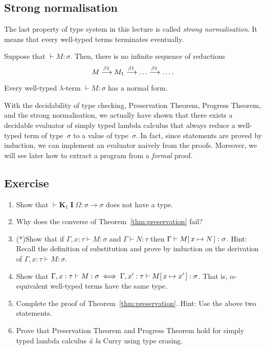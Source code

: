 \subsection{Strong normalisation}
The last property of type system in this lecture is called \emph{strong
  normalisation}. It means that every well-typed terms terminates eventually. 
\begin{theorem}
  Suppose that ${}\vdash M : \sigma$. Then,
  there is no infinite sequence of reductions
  \[
    M \xrightarrow{\beta1} M_1 \xrightarrow{\beta1} \dots \xrightarrow{\beta1} \dots.
  \]
\end{theorem}
\begin{corollary}
  Every well-typed $\lambda$-term ${}\vdash M:\sigma$ has a normal form.
\end{corollary}
With the decidability of type checking, Preservation Theorem, Progress Theorem,
and the strong normalisation, we actually have shown that there exists a
decidable evaluator of simply typed lambda calculus that always reduce a
well-typed term of type~$\sigma$ to a value of type~$\sigma$. In fact, since
statements are proved by induction, we can implement an evaluator naively from
the proofs. Moreover, we will see later how to extract a program from a
\emph{formal} proof.
\subsection*{Exercise}
\begin{enumerate}
  \item Show that $\vdash \mathbf{K}_1\;\mathbf{I}\;\Omega : \sigma \to \sigma$
    does not have a type.
  \item Why does the converse of Theorem~\ref{thm:preservation} fail?
  \item (*)Show that if $\Gamma, x : \tau \vdash M : \sigma$
    and $\Gamma \vdash N : \tau$ then $\Gamma \vdash M[\,x\mapsto N\,] : \sigma$.
    Hint: Recall the definition of substitution and prove by induction
    on the derivation of $\Gamma, x:\tau\vdash M : \sigma$.
  \item Show that $\Gamma, x : \tau \vdash M :\sigma
    \iff \Gamma, x' : \tau \vdash M[\,x\mapsto x'\,] : \sigma$. That is,
    $\alpha$-equivalent well-typed terms have the same type.
  \item Complete the proof of Theorem~\ref{thm:preservation}. Hint: Use the
    above two statements.
  \item Prove that Preservation Theorem and Progress Theorem hold for
    simply typed lambda calculus \textit{\`a la} Curry using type erasing.
\end{enumerate}
